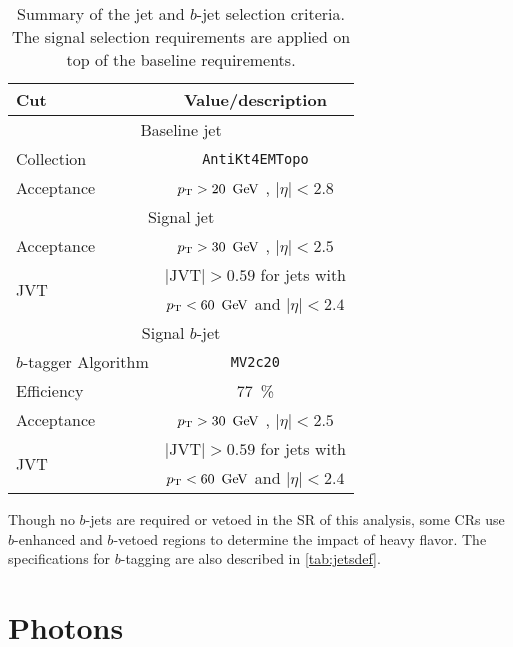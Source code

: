 \begin{table}[bh!]
\begin{center}
    \begin{tabular}{l|c}
      \hline
      Cut            & Value/description \\
      \hline
      \hline
      \multicolumn{2}{c}{Baseline jet} \\
      \hline
      Collection     & \texttt{AntiKt4EMTopo} \\
      Acceptance     & $\pt > 20\,\GeV$ , $|\eta |<2.8$ \\
      \hline
      \multicolumn{2}{c}{Signal jet} \\
      \hline
      Acceptance     & $\pt > 30\,\GeV$ , $|\eta | < 2.5$ \\ 
      \multirow{2}{*}{JVT}      & $|\mathrm{JVT}|>0.59$ for jets with \\
                                & $\pt <60\,\GeV$ and $|\eta | < 2.4$ \\
      \hline
      \multicolumn{2}{c}{Signal $b$-jet} \\
      \hline 
      $b$-tagger Algorithm      & \texttt{MV2c20} \\
      Efficiency                & $77$~\% \\
      Acceptance                & $\pt > 30\,\GeV$ , $|\eta | < 2.5$ \\ 
      \multirow{2}{*}{JVT}      & $|\mathrm{JVT}|>0.59$ for jets with \\
                                & $\pt <60\,\GeV$ and $|\eta | < 2.4$ \\
      \hline
      \hline
\end{tabular}
\end{center}
\caption{Summary of the jet and $b$-jet selection criteria. The signal selection
  requirements are applied on top of the baseline requirements. }
\label{tab:jetsdef}
\end{table}

Though no $b$-jets are required or vetoed in the \ac{SR} of this analysis, some \acp{CR} use $b$-enhanced and $b$-vetoed regions to determine the impact of heavy flavor. The specifications for $b$-tagging are also described in \autoref{tab:jetsdef}.

\section{Photons}

